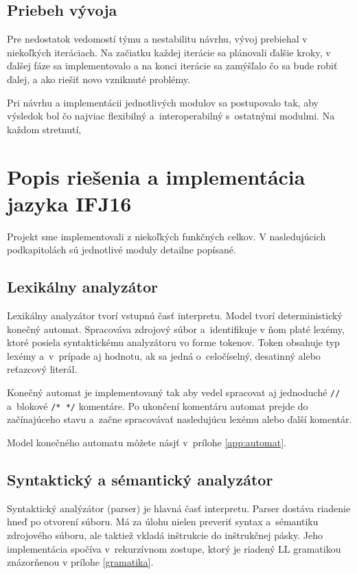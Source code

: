 \documentclass[11pt,a4paper]{article}
\begin{document}
    \subsection{Priebeh vývoja}
    \label{vyvoj}
    Pre nedostatok vedomostí týmu a nestabilitu návrhu, vývoj prebiehal v niekoľkých iteráciach. Na začiatku každej iterácie sa plánovali ďalšie kroky, v ďalšej fáze sa implementovalo a na konci iterácie sa zamýšľalo čo sa bude robiť ďalej, a ako riešiť novo vzniknuté problémy.

    Pri návrhu a implementácii jednotlivých modulov sa postupovalo tak, aby výsledok bol čo najviac flexibilný a~interoperabilný s~ostatnými modulmi. Na každom stretnutí, 

\section{Popis riešenia a implementácia jazyka IFJ16}
\label{popis}

Projekt sme implementovali z niekoľkých funkčných celkov. V nasledujúcich podkapitolách sú jednotlivé moduly detailne popísané.

    \subsection{Lexikálny analyzátor}
    \label{lexer}
    Lexikálny analyzátor tvorí vstupnú časť interpretu. Model tvorí deterministický konečný automat.
    Spracováva zdrojový súbor a~identifikuje v ňom platé lexémy, ktoré posiela syntaktickému analyzátoru vo forme tokenov.
    Token obsahuje typ lexémy a~v~prípade aj hodnotu, ak sa jedná o~celočíselný, desatinný alebo reťazcový literál.

    Konečný automat je implementovaný tak aby vedel spracovat aj jednoduché \texttt{//} a~blokové \texttt{/* */} komentáre.
    Po ukončení komentáru  automat prejde do začínajúceho stavu a~začne spracovávať nasledujúcu lexému alebo ďalší komentár.

    Model konečného automatu môžete násjť v~prílohe \ref{app:automat}.


    \subsection{Syntaktický a sémantický analyzátor}
    \label{parser}
    Syntaktický analýzátor (parser) je hlavná časť interpretu. Parser dostáva riadenie hneď po otvorení súboru. Má za úlohu nielen preveriť syntax a~sémantiku zdrojového súboru, ale taktiež vkladá inštrukcie do inštrukčnej pásky. Jeho implementácia spočíva v~rekurzívnom zostupe, ktorý je riadený LL gramatikou znázorňenou v prílohe \ref{gramatika}.
\end{document}
